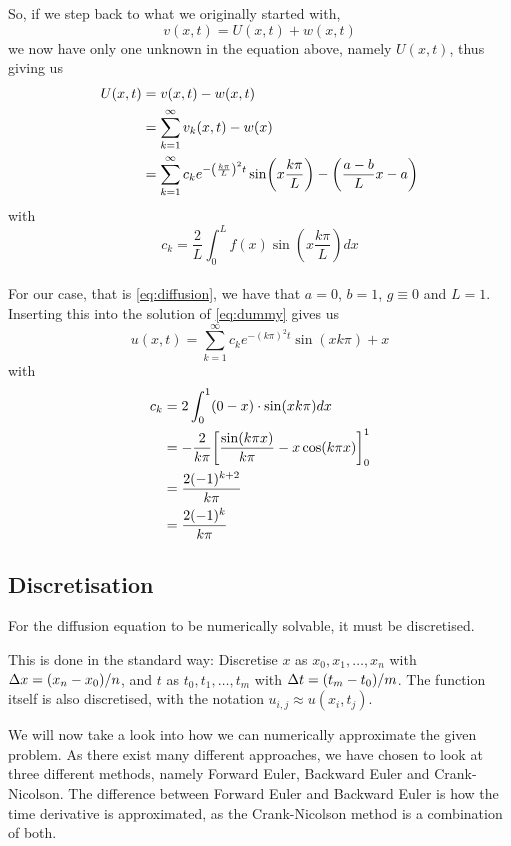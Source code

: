 \documentclass[12pt,english,a4paper]{article}
\begin{document}
So, if we step back to what we originally started with,
\[
v(x,t) = U(x,t) + w(x,t)
\]
we now have only one unknown in the equation above, namely \(U(x,t)\), thus giving us
\begin{align*}
 U(x,t) &= v(x,t)- w(x,t) \\
 &=  \sum_{k=1}^\infty v_k(x,t) - w(x) \\
 &=\sum_{k=1}^\infty c_ke^{-\qty(\frac{k \pi}{L})^2t}\sin(x\frac{k \pi}{L})  -\qty(\frac{a-b}{L}x - a)
\end{align*}
with
\[
c_k = \frac{2}{L}\int_0^Lf(x)\sin(x\frac{k \pi}{L})dx
\]
\hfill \\
For our case, that is \vref{eq:diffusion}, we have that \(a = 0\), \(b = 1\), \(g \equiv 0\) and \(L = 1\). Inserting this into the solution of \vref{eq:dummy} gives us
\begin{equation}\label{eq:analyticalSolution}
	u(x,t) = \sum_{k=1}^\infty c_ke^{-(k\pi)^2t}\sin(xk\pi)  + x
\end{equation}
with
\begin{align*}
c_k &= 2\int_0^1(0-x)\cdot\sin(xk\pi)dx \\
&= - \frac{2}{k\pi}\qty[\frac{\sin(k\pi x)}{k\pi} - x\cos(k\pi x)]_0^1 \\
&= \frac{2(-1)^{k+2}}{k\pi} \\
&=  \frac{2(-1)^k}{k\pi}
\end{align*}

\subsection{Discretisation}


For the diffusion equation to be numerically solvable, it must be discretised.

This is done in the standard way: Discretise \(x\) as \(x_0,x_1,\dots,x_n\) with \(\Delta x=\qty(x_n-x_0)/n\), and \(t\) as \(t_0,t_1,\dots,t_m\) with \(\Delta t = \qty(t_m-t_0)/m\). The function itself is also discretised, with the notation \(u_{i,j} \approx u(x_i,t_j)\).

We will now take a look into how we can numerically approximate the given problem. As there exist many different approaches, we have chosen to look at three different methods, namely Forward Euler, Backward Euler and Crank-Nicolson. The difference between Forward Euler and Backward Euler is how the time derivative is approximated, as the Crank-Nicolson method is a combination of both.
%
\end{document}
